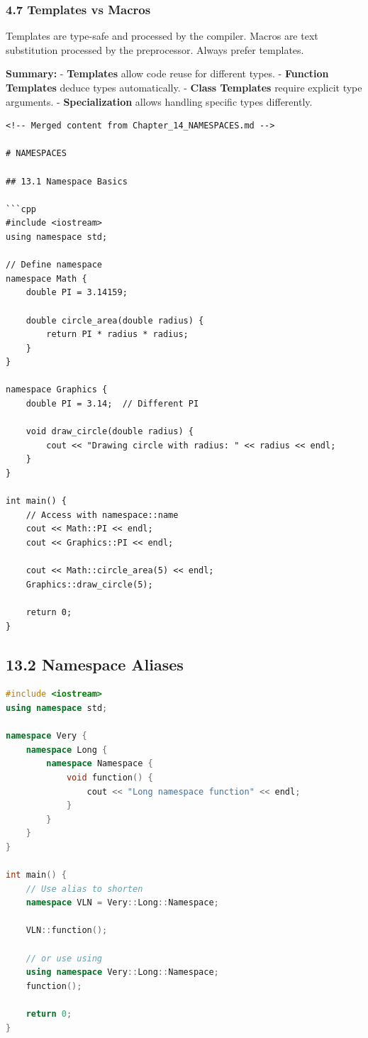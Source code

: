 \hypertarget{templates-vs-macros}{%
\subsubsection{4.7 Templates vs Macros}\label{templates-vs-macros}}

Templates are type-safe and processed by the compiler. Macros are text
substitution processed by the preprocessor. Always prefer templates.

\textbf{Summary:} - \textbf{Templates} allow code reuse for different
types. - \textbf{Function Templates} deduce types automatically. -
\textbf{Class Templates} require explicit type arguments. -
\textbf{Specialization} allows handling specific types differently.

\begin{lstlisting}
<!-- Merged content from Chapter_14_NAMESPACES.md -->

# NAMESPACES

## 13.1 Namespace Basics

```cpp
#include <iostream>
using namespace std;

// Define namespace
namespace Math {
    double PI = 3.14159;

    double circle_area(double radius) {
        return PI * radius * radius;
    }
}

namespace Graphics {
    double PI = 3.14;  // Different PI

    void draw_circle(double radius) {
        cout << "Drawing circle with radius: " << radius << endl;
    }
}

int main() {
    // Access with namespace::name
    cout << Math::PI << endl;
    cout << Graphics::PI << endl;

    cout << Math::circle_area(5) << endl;
    Graphics::draw_circle(5);

    return 0;
}
\end{lstlisting}

\hypertarget{namespace-aliases}{%
\subsection{13.2 Namespace Aliases}\label{namespace-aliases}}

\begin{lstlisting}[language={C++}]
#include <iostream>
using namespace std;

namespace Very {
    namespace Long {
        namespace Namespace {
            void function() {
                cout << "Long namespace function" << endl;
            }
        }
    }
}

int main() {
    // Use alias to shorten
    namespace VLN = Very::Long::Namespace;

    VLN::function();

    // or use using
    using namespace Very::Long::Namespace;
    function();

    return 0;
}
\end{lstlisting}

